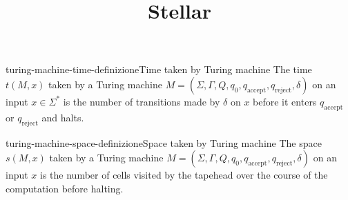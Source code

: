 \documentclass[preview]{standalone}
\begin{document}
\title{Stellar}
\genpage

\begin{snippetdefinition}{turing-machine-time-definizione}{Time taken by Turing machine}
    The time $t(M, x)$ taken by a Turing machine $M=\left(\Sigma, \Gamma, Q, q_0, q_{\text {accept}}, q_{\text {reject}}, \delta\right)$
    on an input $x \in \Sigma^*$ is the number of transitions made by $\delta$ on $x$ before it enters $q_{\text {accept}}$ or $q_{\text {reject}}$ and halts.
\end{snippetdefinition}

\begin{snippetdefinition}{turing-machine-space-definizione}{Space taken by Turing machine}
    The space $s(M, x)$ taken by a Turing machine $M=\left(\Sigma, \Gamma, Q, q_0, q_{\text {accept}}, q_{\text {reject}}, \delta\right)$
    on an input $x$ is the number of cells visited by the tapehead over the course of the computation before halting.
\end{snippetdefinition}
\end{document}

